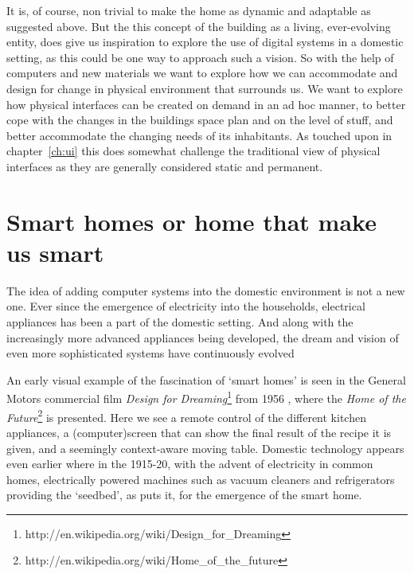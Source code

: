 It is, of course, non trivial to make the home as dynamic and adaptable as suggested above.
But the this concept of the building as a living, ever-evolving entity, does give us inspiration to explore the use of digital systems in a domestic setting, as this could be one way to approach such a vision.
So with the help of computers and new materials we want to explore how we can accommodate and design for change in physical environment that surrounds us.
We want to explore how physical interfaces can be created on demand in an ad hoc manner, to better cope with the changes in the buildings space plan and on the level of stuff, and better accommodate the changing needs of its inhabitants.
As touched upon in chapter~\ref{ch:ui} this does somewhat challenge the traditional view of physical interfaces as they are generally considered static and permanent.

\section{Smart homes or home that make us smart}
The idea of adding computer systems into the domestic environment is not a new one.
Ever since the emergence of electricity into the households, electrical appliances has been a part of the domestic setting.
And along with the increasingly more advanced appliances being developed, the dream and vision of even more sophisticated systems have continuously evolved

An early visual example of the fascination of `smart homes' is seen in the General Motors commercial film \emph{Design for Dreaming}\footnote{http://en.wikipedia.org/wiki/Design\_for\_Dreaming} from 1956 \citep{designfordreaming}, where the \emph{Home of the Future}\footnote{http://en.wikipedia.org/wiki/Home\_of\_the\_future} is presented.
Here we see a remote control of the different kitchen appliances, a (computer)screen that can show the final result of the recipe it is given, and a seemingly context-aware moving table.
Domestic technology appears even earlier where in the 1915-20, with the advent of electricity in common homes, electrically powered machines such as vacuum cleaners and refrigerators providing the `seedbed', as \citet{aldrich2003smart} puts it, for the emergence of the smart home.

